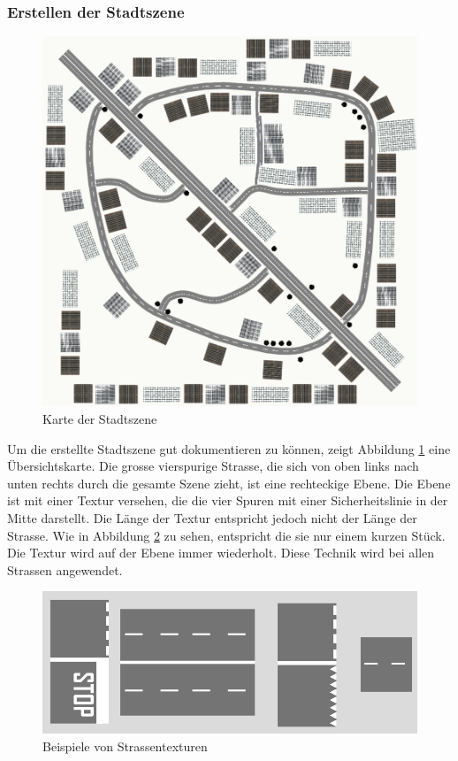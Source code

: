 \subsubsection{Erstellen der Stadtszene}
\begin{figure}[H]
\centering 
\includegraphics[width=1\linewidth]{src/CityWorld_map.png}
\caption{Karte der Stadtszene} %
\label{CityWorld_map} %
\end{figure}
Um die erstellte Stadtszene gut dokumentieren zu können, zeigt Abbildung \ref{CityWorld_map} eine Übersichtskarte. Die grosse vierspurige Strasse, die sich von oben links nach unten rechts durch die gesamte Szene zieht, ist eine rechteckige Ebene. Die Ebene ist mit einer Textur versehen, die die vier Spuren mit einer Sicherheitslinie in der Mitte darstellt. Die Länge der Textur entspricht jedoch nicht der Länge der Strasse. Wie in Abbildung \ref{examples_street_textures} zu sehen, entspricht die sie nur einem kurzen Stück. Die Textur wird auf der Ebene immer wiederholt. Diese Technik wird bei allen Strassen angewendet.\\
\begin{figure}[H]
\centering 
\includegraphics[scale=0.6]{src/examples_street_textures.png}
\caption{Beispiele von Strassentexturen} %
\label{examples_street_textures} %
\end{figure}
